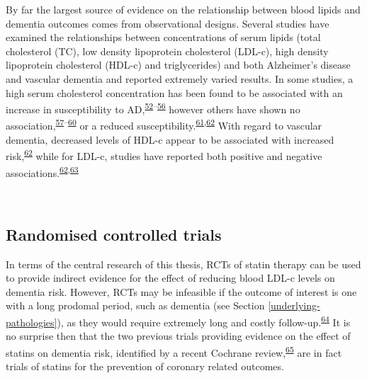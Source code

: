 \documentclass[a4paper, twoside]{templates/ociamthesis}
\begin{document}
By far the largest source of evidence on the relationship between blood lipids and dementia outcomes comes from observational designs. Several studies have examined the relationships between concentrations of serum lipids (total cholesterol (TC), low density lipoprotein cholesterol (LDL-c), high density lipoprotein cholesterol (HDL-c) and triglycerides) and both Alzheimer's disease and vascular dementia and reported extremely varied results. In some studies, a high serum cholesterol concentration has been found to be associated with an increase in susceptibility to AD,\textsuperscript{\protect\hyperlink{ref-kivipelto2002}{52}--\protect\hyperlink{ref-whitmer2005}{56}} however others have shown no association,\textsuperscript{\protect\hyperlink{ref-li2005}{57}--\protect\hyperlink{ref-tan2003}{60}} or a reduced susceptibility.\textsuperscript{\protect\hyperlink{ref-mielke2005}{61},\protect\hyperlink{ref-reitz2004}{62}} With regard to vascular dementia, decreased levels of HDL-c appear to be associated with increased risk,\textsuperscript{\protect\hyperlink{ref-reitz2004}{62}} while for LDL-c, studies have reported both positive and negative associations.\textsuperscript{\protect\hyperlink{ref-reitz2004}{62},\protect\hyperlink{ref-moroney1999}{63}}

~

\hypertarget{randomised-controlled-trials}{%
\subsection{Randomised controlled trials}\label{randomised-controlled-trials}}

In terms of the central research of this thesis, RCTs of statin therapy can be used to provide indirect evidence for the effect of reducing blood LDL-c levels on dementia risk. However, RCTs may be infeasible if the outcome of interest is one with a long prodomal period, such as dementia (see Section \ref{underlying-pathologies}), as they would require extremely long and costly follow-up.\textsuperscript{\protect\hyperlink{ref-ritchie2015}{64}} It is no surprise then that the two previous trials providing evidence on the effect of statins on dementia risk, identified by a recent Cochrane review,\textsuperscript{\protect\hyperlink{ref-mcguinness2016}{65}} are in fact trials of statins for the prevention of coronary related outcomes.
\end{document}
